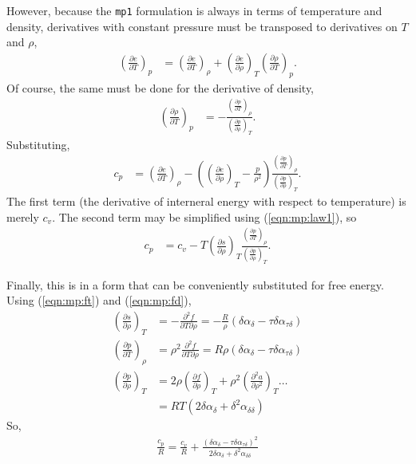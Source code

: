 However, because the \texttt{mp1} formulation is always in terms of temperature and density, derivatives with constant pressure must be transposed to derivatives on $T$ and $\rho$, 
\begin{align*}
\left(\frac{\partial e}{\partial T}\right)_p &=  \left(\frac{\partial e}{\partial T}\right)_\rho +  \left(\frac{\partial e}{\partial \rho}\right)_T  \left(\frac{\partial \rho}{\partial T}\right)_p.
\end{align*}
Of course, the same must be done for the derivative of density,
\begin{align*}
\left(\frac{\partial \rho}{\partial T}\right)_p &= -\frac{ \left(\frac{\partial p}{\partial T}\right)_\rho }{ \left(\frac{\partial p}{\partial \rho}\right)_T }.
\end{align*}
Substituting,
\begin{align*}
c_p &= \left(\frac{\partial e}{\partial T}\right)_\rho - \left(\left(\frac{\partial e}{\partial \rho}\right)_T - \frac{p}{\rho^2}\right) \frac{ \left(\frac{\partial p}{\partial T}\right)_\rho }{ \left(\frac{\partial p}{\partial \rho}\right)_T }.
\end{align*}
The first term (the derivative of interneral energy with respect to temperature) is merely $c_v$.  The second term may be simplified using (\ref{eqn:mp:law1}), so
\begin{align*}
c_p &= c_v - T\left(\frac{\partial s}{\partial \rho}\right)_T \frac{ \left(\frac{\partial p}{\partial T}\right)_\rho }{ \left(\frac{\partial p}{\partial \rho}\right)_T }.
\end{align*}

Finally, this is in a form that can be conveniently substituted for free energy.  Using (\ref{eqn:mp:ft}) and (\ref{eqn:mp:fd}),
\begin{align*}
\left(\frac{\partial s}{\partial \rho}\right)_T &= - \frac{\partial^2 f}{\partial T \partial \rho} = - \frac{R}{\rho}\left( \delta \alpha_\delta - \tau \delta \alpha_{\tau\delta} \right)\\
\left(\frac{\partial p}{\partial T}\right)_\rho &= \rho^2 \frac{\partial^2 f}{\partial T \partial \rho} = R \rho \left( \delta \alpha_\delta - \tau \delta \alpha_{\tau\delta} \right)\\
\left(\frac{\partial p}{\partial \rho}\right)_T &= 2 \rho \left(\frac{\partial f}{\partial \rho}\right)_T + \rho^2 \left(\frac{\partial^2 a}{\partial \rho^2}\right)_T \ldots\\
 &= RT \left( 2\delta \alpha_\delta + \delta^2 \alpha_{\delta\delta} \right)
\end{align*}
So, 
\begin{align}
\frac{c_p}{R} = \frac{c_v}{R} + \frac{\left(\delta \alpha_\delta - \tau \delta \alpha_{\tau\delta} \right)^2}{2\delta \alpha_\delta + \delta^2\alpha_{\delta\delta}}
\end{align}



